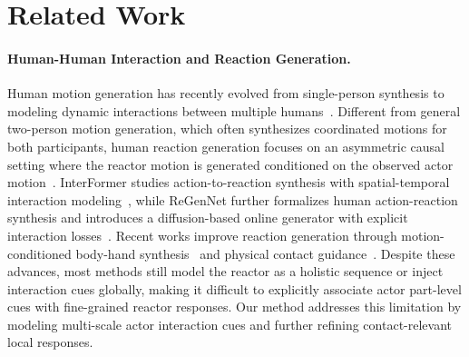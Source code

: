 \documentclass{article}
\begin{document}
% 
% 



\section{Related Work}

\paragraph{Human-Human Interaction and Reaction Generation.}
Human motion generation has recently evolved from single-person synthesis to modeling dynamic interactions between multiple humans~\citep{xu2024inter,ghosh2024remos}. Different from general two-person motion generation, which often synthesizes coordinated motions for both participants, human reaction generation focuses on an asymmetric causal setting where the reactor motion is generated conditioned on the observed actor motion~\citep{chopin2023interaction,xu2024regennet}. InterFormer studies action-to-reaction synthesis with spatial-temporal interaction modeling~\citep{chopin2023interaction}, while ReGenNet further formalizes human action-reaction synthesis and introduces a diffusion-based online generator with explicit interaction losses~\citep{xu2024regennet}. Recent works improve reaction generation through motion-conditioned body-hand synthesis~\citep{ghosh2024remos} and physical contact guidance~\citep{zhang2025reactffusion}. Despite these advances, most methods still model the reactor as a holistic sequence or inject interaction cues globally, making it difficult to explicitly associate actor part-level cues with fine-grained reactor responses. Our method addresses this limitation by modeling multi-scale actor interaction cues and further refining contact-relevant local responses.
\end{document}
